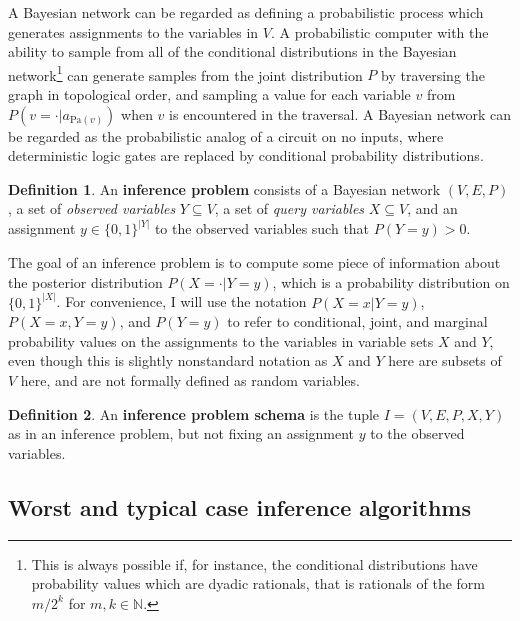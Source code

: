 \documentclass{article}
\theoremstyle{definition}
\newtheorem{defn}{Definition}
\theoremstyle{remark}
\def \Pa{\text{Pa}}
\begin{document}
A Bayesian network can be regarded as defining a probabilistic process which generates assignments to the variables in $V$.
A probabilistic computer with the ability to sample from all of the conditional distributions in the Bayesian network\footnote{
This is always possible if, for instance, the conditional distributions have probability values which are dyadic rationals, that is rationals of the form $m/2^k$ for $m, k \in \mathbb{N}$.
} can generate samples from the joint distribution $P$ by traversing the graph in topological order, and sampling a value for each variable $v$ from $P(v = \cdot | a_{\Pa(v)})$ when $v$ is encountered in the traversal.
A Bayesian network can be regarded as the probabilistic analog of a circuit on no inputs, where deterministic logic gates are replaced by conditional probability distributions.

\begin{defn}
An \textbf{inference problem} consists of a Bayesian network $(V, E, P)$, a set of \textit{observed variables} $Y \subseteq V$, a set of \textit{query variables} $X \subseteq V$, and an assignment $y \in \{0, 1\}^{|Y|}$ to the observed variables such that $P(Y = y) > 0$.
\end{defn}
The goal of an inference problem is to compute some piece of information about the posterior distribution $P(X = \cdot | Y = y)$, which is a probability distribution on $\{0, 1\}^{|X|}$.
For convenience, I will use the notation $P(X = x | Y = y)$, $P(X = x, Y = y)$, and $P(Y = y)$ to refer to conditional, joint, and marginal probability values on the assignments to the variables in variable sets $X$ and $Y$,
even though this is slightly nonstandard notation as $X$ and $Y$ here are subsets of $V$ here, and are not formally defined as random variables.

\begin{defn}
An \textbf{inference problem schema} is the tuple $I = (V, E, P, X, Y)$ as in an inference problem, but not fixing an assignment $y$ to the observed variables.
\end{defn}

\subsection{Worst and typical case inference algorithms}
\end{document}
